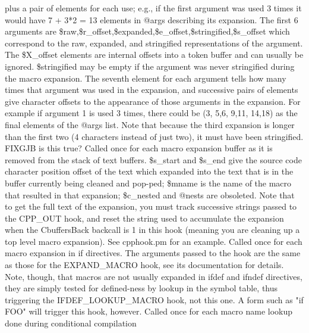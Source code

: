 plus a pair of elements for each use;  e.g., if the first argument was used 3 times
it would have 7 + 3*2 = 13 elements in @args describing its expansion.  The
first 6 arguments are \$raw,\$r\_\-offset,\$expanded,\$e\_\-offset,\$stringified,\$s\_\-offset
which correspond to the raw, expanded, and stringified representations of the
argument.  The \$X\_\-offset elements are internal offsets into a token buffer
and can usually be ignored.  \$stringified may be empty if the argument was
never stringified during the macro expansion.  The seventh element for each
argument tells how many times that argument was used in the expansion, and
successive pairs of elements give character offsets to the appearance of those
arguments in the expansion.  For example if argument 1 is used 3 times, there could
be (3, 5,6, 9,11,  14,18) as the final elements of the @args list.  Note that
because the third expansion is longer than the first two (4 characters instead of
just two), it must have been stringified. FIXGJB is this true?
Called once for each macro expansion buffer as it is removed 
from the stack of text buffers.  \$s\_\-start and \$s\_\-end give the source
code character position offset of the text which expanded into the text
that is in the buffer currently being cleaned and pop-ped;  \$mname is the
name of the macro that resulted in that expansion; \$c\_\-nested and @nests
are obsoleted.  Note that to get the full text of the expansion, you must
track successive strings passed to the CPP\_\-OUT hook, and reset the
string used to accumulate the expansion when the CbuffersBack backcall
is 1 in this hook (meaning you are cleaning up a top level macro expansion).
See cpphook.pm for an example.
Called once for each macro expansion in \pphash{}if directives.  The arguments
passed to the hook are the same as those for the EXPAND\_\-MACRO hook, see its
documentation for details.  Note, though, that macros are not usually
expanded in \pphash{}ifdef and \pphash{}ifndef directives, they are simply tested for
defined-ness by lookup in the symbol table, thus triggering the IFDEF\_\-LOOKUP\_\-MACRO
hook, not this one.  A form such as "\pphash{}if FOO" will trigger this hook, however.
Called once for each macro name lookup done during conditional compilation

